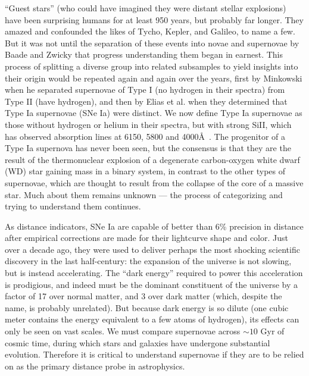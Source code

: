\documentclass{nature1}
\begin{document}
``Guest stars'' (who could have imagined they were distant stellar
explosions) have been surprising humans for at least 950 years, but
probably far longer.  They amazed and confounded the likes of Tycho,
Kepler, and Galileo, to name a few.  But it was not until the
separation of these events into novae and supernovae by Baade and
Zwicky that progress understanding them began in
earnest\citep{1934PhRv...46...76B}.  This process of splitting a
diverse group into related subsamples to yield insights into their
origin would be repeated again and again over the years, first by
Minkowski when he separated supernovae of Type I (no hydrogen in their
spectra) from Type II (have hydrogen)\citep{1941PASP...53..224M}, and
then by Elias et al. when they determined that Type Ia supernovae (SNe
Ia) were distinct\citep{1985ApJ...296..379E}.  We now define Type Ia
supernovae as those without hydrogen or helium in their spectra, but
with strong SiII, which has observed absorption lines at 6150, 5800
and 4000\AA\ \citep{1997ARA&A..35..309F}.  The progenitor of a Type Ia
supernova has never been seen, but the consensus is that they are the
result of the thermonuclear explosion of a degenerate carbon-oxygen
white dwarf (WD) star\citep{1960ApJ...132..565H} gaining mass in a binary
system\citep{1973ApJ...186.1007W}, in contrast to the other types of
supernovae, which are thought to result from the collapse of the core
of a massive star.  Much about them remains unknown --- the process of
categorizing and trying to understand them continues.

As distance indicators, SNe Ia are capable of better than 6\% precision in
distance after empirical corrections are made for their lightcurve
shape and color.  Just over a decade ago, they were used to deliver
perhaps the most shocking scientific discovery in the last
half-century: the expansion of the universe is not slowing, but is
instead accelerating\citep{1998AJ....116.1009R,1999ApJ...517..565P}.
The ``dark energy'' required to power this acceleration is prodigious,
and indeed must be the dominant constituent of the universe by a
factor of 17 over normal matter, and 3 over dark matter (which,
despite the name, is probably unrelated).  But because dark energy is so dilute
(one cubic meter contains the energy equivalent to a few atoms of
hydrogen), its effects can only be seen on vast scales.  We must
compare supernovae across $\sim 10$ Gyr of cosmic time, during which
stars and galaxies have undergone substantial evolution.  Therefore it
is critical to understand supernovae if they are to be relied on as
the primary distance probe in astrophysics.
\end{document}
